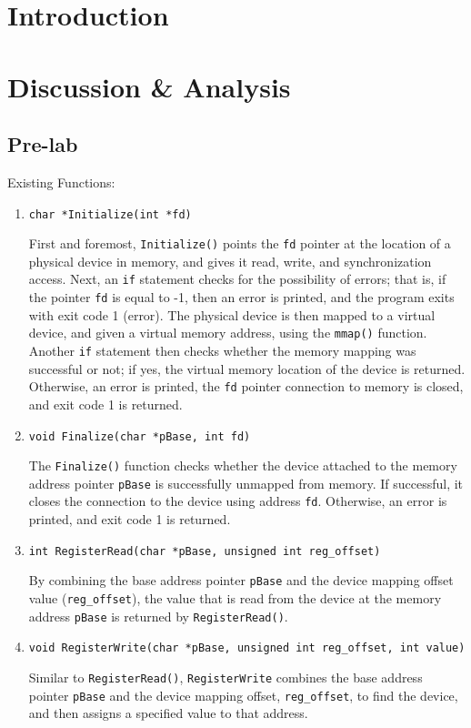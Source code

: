 \documentclass[
	letterpaper, %
	10pt, %
]{CSUniSchoolLabReport}
\begin{document}
\section{Introduction}

\section{Discussion \& Analysis} 

\subsection{Pre-lab}

  \item Existing Functions:

    \begin{enumerate}

      \item \texttt{char *Initialize(int *fd)}

        First and foremost, \texttt{Initialize()} points the \texttt{fd} pointer at the location of a physical device in memory, and gives it read, write, and synchronization access. Next, an \texttt{if} statement checks for the possibility of errors; that is, if the pointer \texttt{fd} is equal to -1, then an error is printed, and the program exits with exit code 1 (error). The physical device is then mapped to a virtual device, and given a virtual memory address, using the \texttt{mmap()} function. Another \texttt{if} statement then checks whether the memory mapping was successful or not; if yes, the virtual memory location of the device is returned. Otherwise, an error is printed, the \texttt{fd} pointer connection to memory is closed, and exit code 1 is returned.

      \item \texttt{void Finalize(char *pBase, int fd)}

        The \texttt{Finalize()} function checks whether the device attached to the memory address pointer \texttt{pBase} is successfully unmapped from memory. If successful, it closes the connection to the device using address \texttt{fd}. Otherwise, an error is printed, and exit code 1 is returned.

      \item \texttt{int RegisterRead(char *pBase, unsigned int reg\_offset)}

        By combining the base address pointer \texttt{pBase} and the device mapping offset value (\texttt{reg\_offset}), the value that is read from the device at the memory address \texttt{pBase} is returned by \texttt{RegisterRead()}.

      \item \texttt{void RegisterWrite(char *pBase, unsigned int reg\_offset, int value)}

        Similar to \texttt{RegisterRead()}, \texttt{RegisterWrite} combines the base address pointer \texttt{pBase} and the device mapping offset, \texttt{reg\_offset}, to find the device, and then assigns a specified value to that address.

    \end{enumerate}
\end{document}
